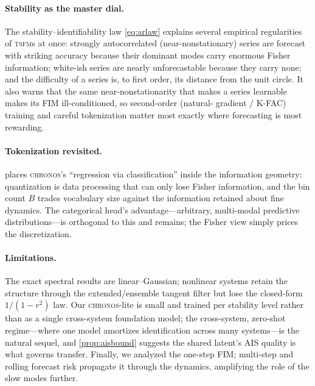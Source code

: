 \documentclass[10pt]{article}
\theoremstyle{plain}
\theoremstyle{definition}
\theoremstyle{remark}
\newcommand{\TSFM}{\textsc{tsfm}}
\newcommand{\Chronos}{\textsc{chronos}}
\begin{document}
\paragraph{Stability as the master dial.}
The stability--identifiability law \eqref{eq:arlaw} explains several empirical
regularities of \TSFM s at once: strongly autocorrelated (near-nonstationary)
series are forecast with striking accuracy because their dominant modes carry
enormous Fisher information; white-ish series are nearly unforecastable because
they carry none; and the difficulty of a series is, to first order, its distance
from the unit circle. It also warns that the same near-nonstationarity that makes
a series learnable makes its FIM ill-conditioned, so second-order (natural-%
gradient / K-FAC) training and careful tokenization matter most exactly where
forecasting is most rewarding.

\paragraph{Tokenization revisited.}
 places \Chronos's ``regression via classification'' inside the
information geometry: quantization is data processing that can only lose Fisher
information, and the bin count $B$ trades vocabulary size against the information
retained about fine dynamics. The categorical head's advantage---arbitrary,
multi-modal predictive distributions---is orthogonal to this and remains; the
Fisher view simply prices the discretization.

\paragraph{Limitations.}
The exact spectral results are linear--Gaussian; nonlinear systems retain the
structure through the extended/ensemble tangent filter but lose the closed-form
$1/(1-r^2)$ law. Our \Chronos-lite is small and trained per stability level
rather than as a single cross-system foundation model; the cross-system,
zero-shot regime---where one model amortizes identification across many
systems---is the natural sequel, and \cref{prop:aisbound} suggests the shared
latent's AIS quality is what governs transfer. Finally, we analyzed the
one-step FIM; multi-step and rolling forecast risk propagate it through the
dynamics, amplifying the role of the slow modes further.
\end{document}
